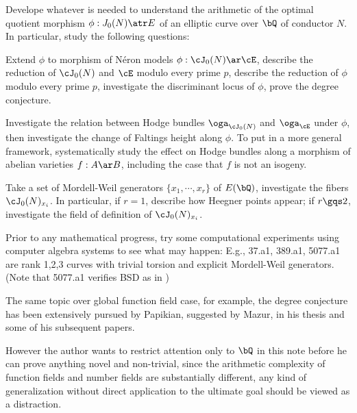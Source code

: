 \documentclass[a4paper, twoside]{article}
\begin{document}
\confighead{}{}{}





 Develope whatever is needed to understand the arithmetic of the optimal quotient morphism $\phi:J_{0}(N)\atr E$ of an elliptic curve over $\bQ$ of conductor $N$. In particular, study the following questions:
\begin{itm}
	\item[\TODO] Extend $\phi$ to morphism of N{\'e}ron models $\phi:\cJ_{0}(N)\ar\cE$, describe the reduction of $\cJ_{0}(N)$ and $\cE$ modulo every prime $p$, describe the reduction of $\phi$ modulo every prime $p$, investigate the discriminant locus of $\phi$, prove the degree conjecture.
	\item[\TODO] Investigate the relation between Hodge bundles $\oga_{\cJ_{0}(N)}$ and $\oga_{\cE}$ under $\phi$, then investigate the change of Faltings height along $\phi$. To put in a more general framework, systematically study the effect on Hodge bundles along a morphism of abelian varieties $f:A\ar B$, including the case that $f$ is not an isogeny.
	\item[\TODO] Take a set of Mordell-Weil generators $\{x_{1},\cdots,x_{r}\}$ of $E(\bQ)$, investigate the fibers $\cJ_{0}(N)_{x_{i}}$. In particular, if $r=1$, describe how Heegner points appear; if $r\gqs2$, investigate the field of definition of $\cJ_{0}(N)_{x_{i}}$.

	Prior to any mathematical progress, try some computational experiments using computer algebra systems to see what may happen: E.g., 37.a1, 389.a1, 5077.a1 are rank 1,2,3 curves with trivial torsion and explicit Mordell-Weil generators. (Note that 5077.a1 verifies BSD as in \cite{BGZ1985})
\end{itm}

\begin{rmk}
	The same topic over global function field case, for example, the degree conjecture has been extensively pursued by Papikian, suggested by Mazur, in his thesis\cite{Papikian2003} and some of his subsequent papers.

	However the author wants to restrict attention only to $\bQ$ in this note before he can prove anything novel and non-trivial, since the arithmetic complexity of function fields and number fields are substantially different, any kind of generalization without direct application to the ultimate goal should be viewed as a distraction.
\end{rmk}
\end{document}
